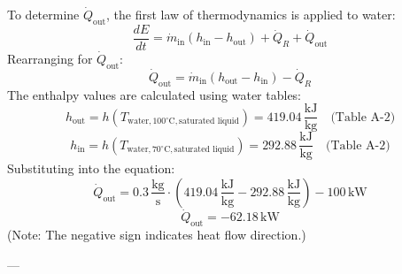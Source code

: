 To determine \( \dot{Q}_{\text{out}} \), the first law of thermodynamics is applied to water:  
\[
\frac{dE}{dt} = \dot{m}_{\text{in}} (h_{\text{in}} - h_{\text{out}}) + \dot{Q}_R + \dot{Q}_{\text{out}}
\]  
Rearranging for \( \dot{Q}_{\text{out}} \):  
\[
\dot{Q}_{\text{out}} = \dot{m}_{\text{in}} (h_{\text{out}} - h_{\text{in}}) - \dot{Q}_R
\]  
The enthalpy values are calculated using water tables:  
\[
h_{\text{out}} = h(T_{\text{water}, 100^\circ \text{C}, \text{saturated liquid}}) = 419.04 \, \frac{\text{kJ}}{\text{kg}} \quad \text{(Table A-2)}
\]  
\[
h_{\text{in}} = h(T_{\text{water}, 70^\circ \text{C}, \text{saturated liquid}}) = 292.88 \, \frac{\text{kJ}}{\text{kg}} \quad \text{(Table A-2)}
\]  
Substituting into the equation:  
\[
\dot{Q}_{\text{out}} = 0.3 \, \frac{\text{kg}}{\text{s}} \cdot (419.04 \, \frac{\text{kJ}}{\text{kg}} - 292.88 \, \frac{\text{kJ}}{\text{kg}}) - 100 \, \text{kW}
\]  
\[
\dot{Q}_{\text{out}} = -62.18 \, \text{kW}
\]  
(Note: The negative sign indicates heat flow direction.)

---